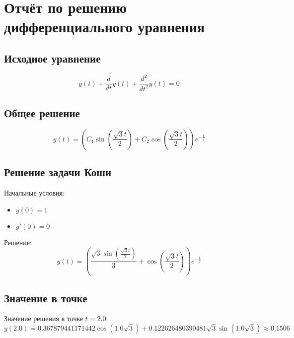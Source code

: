 \documentclass{article}
\begin{document}
\section{Отчёт по решению дифференциального уравнения}

\subsection{Исходное уравнение}
\[ y{\left(t \right)} + \frac{d}{d t} y{\left(t \right)} + \frac{d^{2}}{d t^{2}} y{\left(t \right)} = 0 \]


\subsection{Общее решение}
\[ y{\left(t \right)} = \left(C_{1} \sin{\left(\frac{\sqrt{3} t}{2} \right)} + C_{2} \cos{\left(\frac{\sqrt{3} t}{2} \right)}\right) e^{- \frac{t}{2}} \]

\subsection{Решение задачи Коши}
Начальные условия:
\begin{itemize}
    \item $y(0) = 1$
    \item $y'(0) = 0$
\end{itemize}

Решение:
\[ y{\left(t \right)} = \left(\frac{\sqrt{3} \sin{\left(\frac{\sqrt{3} t}{2} \right)}}{3} + \cos{\left(\frac{\sqrt{3} t}{2} \right)}\right) e^{- \frac{t}{2}} \]


\subsection{Значение в точке}
Значение решения в точке $t = 2.0$:
\[ y(2.0) = 0.367879441171442 \cos{\left(1.0 \sqrt{3} \right)} + 0.122626480390481 \sqrt{3} \sin{\left(1.0 \sqrt{3} \right)} \approx 0.1506 \]
\end{document}
